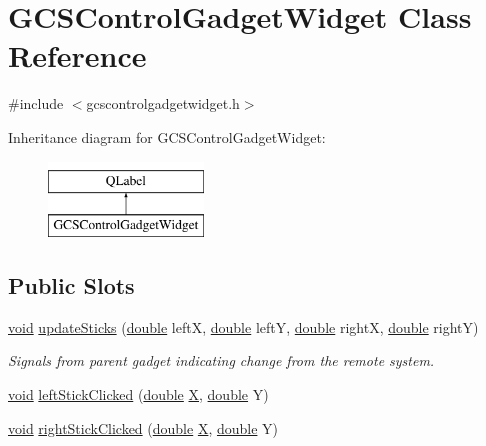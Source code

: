 \hypertarget{class_g_c_s_control_gadget_widget}{\section{G\-C\-S\-Control\-Gadget\-Widget Class Reference}
\label{class_g_c_s_control_gadget_widget}
}


{\ttfamily \#include $<$gcscontrolgadgetwidget.\-h$>$}

Inheritance diagram for G\-C\-S\-Control\-Gadget\-Widget\-:\begin{figure}[H]
\begin{center}
\leavevmode
\includegraphics[height=2.000000cm]{class_g_c_s_control_gadget_widget}
\end{center}
\end{figure}
\subsection*{Public Slots}
\begin{DoxyCompactItemize}
\item 
\hyperlink{group___u_a_v_objects_plugin_ga444cf2ff3f0ecbe028adce838d373f5c}{void} \hyperlink{group___g_c_s_control_gadget_plugin_ga279299922ac5990f798325ad238ae58a}{update\-Sticks} (\hyperlink{_super_l_u_support_8h_a8956b2b9f49bf918deed98379d159ca7}{double} left\-X, \hyperlink{_super_l_u_support_8h_a8956b2b9f49bf918deed98379d159ca7}{double} left\-Y, \hyperlink{_super_l_u_support_8h_a8956b2b9f49bf918deed98379d159ca7}{double} right\-X, \hyperlink{_super_l_u_support_8h_a8956b2b9f49bf918deed98379d159ca7}{double} right\-Y)
\begin{DoxyCompactList}\small\item\em Signals from parent gadget indicating change from the remote system. \end{DoxyCompactList}\item 
\hyperlink{group___u_a_v_objects_plugin_ga444cf2ff3f0ecbe028adce838d373f5c}{void} \hyperlink{group___g_c_s_control_gadget_plugin_ga04d9e7c1a62eff3012500caccbde66d8}{left\-Stick\-Clicked} (\hyperlink{_super_l_u_support_8h_a8956b2b9f49bf918deed98379d159ca7}{double} \hyperlink{_parse_e_k_f_log_8m_ac51b57a703ba1c5869228690c93e1701}{X}, \hyperlink{_super_l_u_support_8h_a8956b2b9f49bf918deed98379d159ca7}{double} Y)
\item 
\hyperlink{group___u_a_v_objects_plugin_ga444cf2ff3f0ecbe028adce838d373f5c}{void} \hyperlink{group___g_c_s_control_gadget_plugin_gab69d624dde0231e33d3a5bb6d4d769fa}{right\-Stick\-Clicked} (\hyperlink{_super_l_u_support_8h_a8956b2b9f49bf918deed98379d159ca7}{double} \hyperlink{_parse_e_k_f_log_8m_ac51b57a703ba1c5869228690c93e1701}{X}, \hyperlink{_super_l_u_support_8h_a8956b2b9f49bf918deed98379d159ca7}{double} Y)
\end{DoxyCompactItemize}
